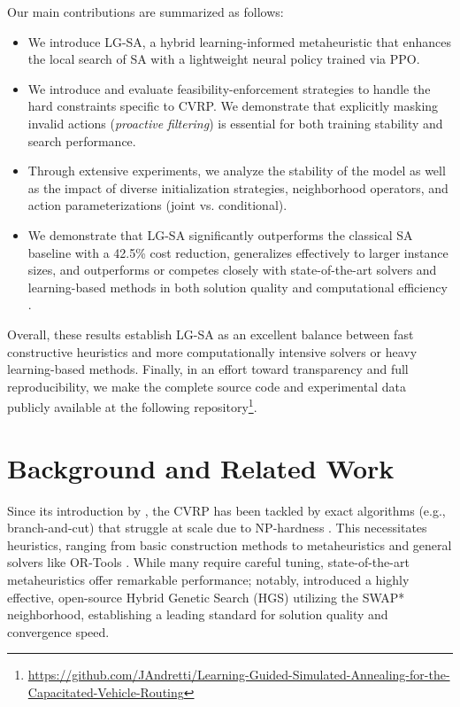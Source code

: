 \documentclass[letterpaper]{article} %
\begin{document}
Our main contributions are summarized as follows:
\begin{itemize}
\item We introduce LG-SA, a hybrid learning-informed metaheuristic that enhances the local search of SA with a lightweight neural policy trained via PPO. 
\item We introduce and evaluate feasibility-enforcement strategies to handle the hard constraints specific to CVRP. We demonstrate that explicitly masking invalid actions (\textit{proactive filtering}) is essential for both training stability and search performance.
\item Through extensive experiments, we analyze the stability of the model as well as the impact of diverse initialization strategies, neighborhood operators, and action parameterizations (joint vs. conditional).
\item We demonstrate that LG-SA significantly outperforms the classical SA baseline with a 42.5\% cost reduction, generalizes effectively to larger instance sizes, and outperforms or competes closely with state-of-the-art solvers and learning-based methods in both solution quality and computational efficiency \citep{ortools_routing, kool_attention_2019, nazari_reinforcement_2018}.
\end{itemize}
Overall, these results establish LG-SA as an excellent balance between fast constructive heuristics and more computationally intensive solvers or heavy learning-based methods. Finally, in an effort toward transparency and full reproducibility, we make the complete source code and experimental data publicly available at the following repository\footnote{\url{https://github.com/JAndretti/Learning-Guided-Simulated-Annealing-for-the-Capacitated-Vehicle-Routing}}.

\section{Background and Related Work}

Since its introduction by \citet{dantzig_truck_1959}, the CVRP has been tackled by exact algorithms (e.g., branch-and-cut) that struggle at scale due to NP-hardness \cite{toth_vehicle_2002}. This necessitates heuristics, ranging from basic construction methods \cite{clarke_scheduling_1964} to metaheuristics \cite{kirkpatrick_optimization_1983} and general solvers like OR-Tools \cite{ortools_routing, liu_heuristics_2023,muriyatmoko_heuristics_2024}. While many require careful tuning, state-of-the-art metaheuristics offer remarkable performance; notably, \citet{vidal_hybrid_2022} introduced a highly effective, open-source Hybrid Genetic Search (HGS) utilizing the SWAP* neighborhood, establishing a leading standard for solution quality and convergence speed.
\end{document}
